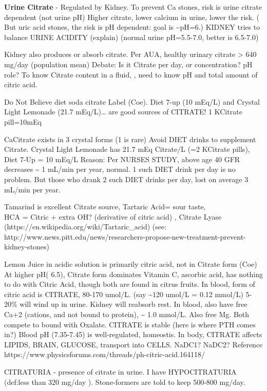 \textbf{Urine Citrate} - Regulated by Kidney. To prevent Ca stones, risk
is urine citrate dependent (not urine pH) Higher citrate, lower calcium
in urine, lower the risk. ( But uric acid stones, the risk is pH
dependent: goal is \textasciitilde pH=6.) KIDNEY tries to balance URINE
ACIDITY (explain) (normal urine pH=5.5-7.0, better is 6.5-7.0)

Kidney also produces or absorb citrate. Per AUA, healthy urinary citrate
\textgreater{} 640 mg/day (population mean) Debate: Is it Citrate per
day, or concentration? pH role? To know Citrate content in a fluid, ,
need to know pH and total amount of citric acid.

Do Not Believe diet soda citrate Label (Coe). Diet 7-up (10 mEq/L) and
Crystal Light Lemonade (21.7 mEq/L)\ldots{} are good sources of CITRATE!
1 KCitrate pill=10mEq

CaCitrate exists in 3 crystal forms (1 is rare) Avoid DIET drinks to
supplement Citrate. Crystal Light Lemonade has 21.7 mEq Citrate/L (=2
KCitrate pills), Diet 7-Up = 10 mEq/L Reason: Per NURSES STUDY, above
age 40 GFR decreases \textasciitilde{} 1 mL/min per year, normal. 1 such
DIET drink per day is no problem. But those who drank 2 such DIET drinks
per day, lost on average 3 mL/min per year.

Tamarind is excellent Citrate source, Tartaric Acid= sour taste,\\
HCA = Citric + extra OH? (derivative of citric acid) , Citrate Lyase
(https://en.wikipedia.org/wiki/Tartaric\_acid) (see:
http://www.news.pitt.edu/news/researchers-propose-new-treatment-prevent-kidney-stones)

Lemon Juice in acidic solution is primarily citric acid, not in Citrate
form (Coe) At higher pH( 6.5), Citrate form dominates Vitamin C,
ascorbic acid, has nothing to do with Citric Acid, though both are found
in citrus fruits. In blood, form of citric acid is CITRATE, 80-170
umol/L. (say \textasciitilde120 umol/L = 0.12 mmol/L) 5-20\% will wind
up in urine. Kidney will reabsorb rest. In blood, also have free Ca+2
(cations, and not bound to protein), \textasciitilde{} 1.0 mmol/L. Also
free Mg. Both compete to bound with Oxalate. CITRATE is stable (here is
where PTH comes in?) Blood pH (7.35-7.45) is well-regulated, homeostis.
In body, CITRATE affects LIPIDS, BRAIN, GLUCOSE, transport into CELLS.
NaDC1? NaDC2? Reference
https://www.physicsforums.com/threads/ph-citric-acid.164118/

CITRATURIA - presence of citrate in urine. I have HYPOCITRATURIA
(def:less than 320 mg/day ). Stone-formers are told to keep 500-800
mg/day.

